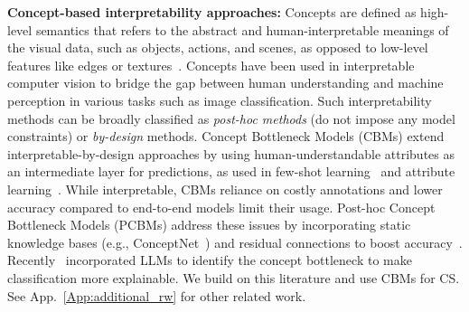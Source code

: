 {\bf Concept-based interpretability approaches: }
Concepts are defined as high-level semantics that refers to the abstract and human-interpretable meanings of the visual data, such as objects, actions, and scenes, as opposed to low-level features like edges or textures~\cite{wu2016valueexplicithighlevel}. 
Concepts have been used in interpretable computer vision to bridge the gap between human understanding and machine perception in various tasks such as image classification. 
Such interpretability methods can be broadly classified as \textit{post-hoc methods} (do not impose any model constraints) or \textit{by-design} methods. 
Concept Bottleneck Models (CBMs) extend interpretable-by-design approaches by using human-understandable attributes as an intermediate layer for predictions, as used in few-shot learning~\cite{lampert2013attribute} and attribute learning~\cite{xu2020attribute,russakovsky2012attribute}.
While interpretable, CBMs reliance on costly annotations and lower accuracy compared to end-to-end models limit their usage.
Post-hoc Concept Bottleneck Models (PCBMs) address these issues by incorporating static knowledge bases (e.g., ConceptNet~\cite{speer2017conceptnet}) and residual connections to boost accuracy~\cite{yuksekgonul2022post}.
Recently~\cite{yang2023language,yan2023learning} incorporated LLMs to identify the concept bottleneck to make classification more explainable. 
We build on this literature and use CBMs for CS. 
See App.~\ref{App:additional_rw} for other related work.




